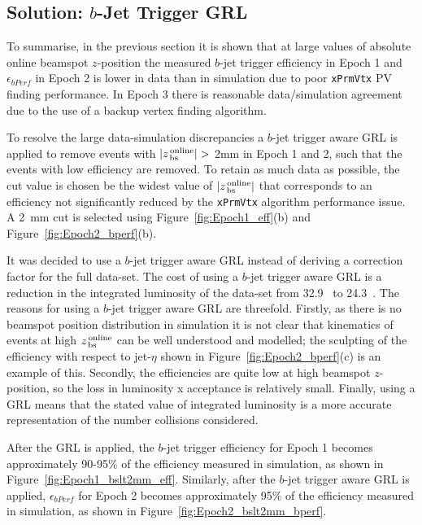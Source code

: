 \newpage
\subsection{Solution: $b$-Jet Trigger GRL}
\label{sec:trig-grl}

To summarise, in the previous section it is shown that at large values of absolute online beamspot $z$-position
the measured $b$-jet trigger efficiency in Epoch 1 and $\epsilon_{bPerf}$ in Epoch 2 is lower in data than in simulation
due to poor \verb|xPrmVtx| PV finding performance.
In Epoch 3 there is reasonable data/simulation agreement due to the use of a backup vertex finding algorithm. 

To resolve the large data-simulation discrepancies a $b$-jet trigger aware GRL is applied
to remove events with $|z_{\,\text{bs}}^{\text{\,online}}| >$ 2mm in Epoch 1 and 2,
such that the events with low efficiency are removed.
To retain as much data as possible, the cut value is chosen be the widest value of $|z_{\,\text{bs}}^{\text{\,online}}|$
that corresponds to an efficiency not significantly reduced by the \verb|xPrmVtx| algorithm performance issue.
A \SI{2}{\mm} cut is selected using Figure~\ref{fig:Epoch1_eff}(b) and Figure~\ref{fig:Epoch2_bperf}(b).

It was decided to use a $b$-jet trigger aware GRL instead of deriving a correction factor for the full data-set.
The cost of using a $b$-jet trigger aware GRL is a reduction in the integrated luminosity of the data-set from  32.9~\ifb{} to 24.3~\ifb.
The reasons for using a $b$-jet trigger aware GRL are threefold.
Firstly, as there is no beamspot position distribution in simulation it is not clear that kinematics of events at high  $z_{\,\text{bs}}^{\text{\,online}}$ can be well understood and modelled;
the sculpting of the efficiency with respect to jet-$\eta$ shown in Figure~\ref{fig:Epoch2_bperf}(c) is an example of this.
Secondly, the efficiencies are quite low at high beamspot $z$-position,
so the loss in luminosity x acceptance is relatively small.
Finally, using a GRL means that the stated value of integrated luminosity is a more accurate representation of the number collisions considered.

After the GRL is applied, the $b$-jet trigger efficiency for Epoch 1 becomes approximately 90-95\% of the efficiency measured in simulation,
as shown in Figure~\ref{fig:Epoch1_bslt2mm_eff}.
Similarly, after the $b$-jet trigger aware GRL is applied, $\epsilon_{bPerf}$ for Epoch 2 becomes approximately 95\% of the efficiency measured in simulation,
as shown in Figure~\ref{fig:Epoch2_bslt2mm_bperf}. 

